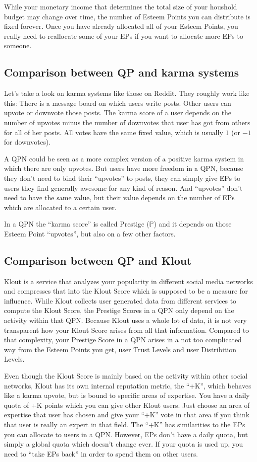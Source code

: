 \documentclass[a4paper,12pt]{scrartcl}
\begin{document}
While your monetary income that determines the total size of your houshold budget may change over time, the number of Esteem Points you can distribute is fixed forever. Once you have already allocated all of your Esteem Points, you really need to reallocate some of your EPs if you want to allocate more EPs to someone.

\subsection{Comparison between QP and karma systems}
Let's take a look on karma systems like those on Reddit. They roughly work like this: There is a message board on which users write posts. Other users can upvote or downvote those posts. The karma score of a user depends on the number of upvotes minus the number of downvotes that user has got from others for all of her posts. All votes have the same fixed value, which is usually $1$ (or $-1$ for downvotes).

A QPN could be seen as a more complex version of a positive karma system in which there are only upvotes. But users have more freedom in a QPN, because they don't need to bind their ``upvotes'' to posts, they can simply give EPs to users they find generally awesome for any kind of reason. And ``upvotes'' don't need to have the same value, but their value depends on the number of EPs which are allocated to a certain user.

In a QPN the ``karma score'' is called Prestige ($\mathbb{P}$) and it depends on those Esteem Point ``upvotes'', but also on a few other factors.

\subsection{Comparison between QP and Klout}
Klout is a service that analyzes your popularity in different social media networks and compresses that into the Klout Score which is supposed to be a measure for influence. While Klout collects user generated data from different services to compute the Klout Score, the Prestige Scores in a QPN only depend on the activity within that QPN. Because Klout uses a whole lot of data, it is not very transparent how your Klout Score arises from all that information. Compared to that complexity, your Prestige Score in a QPN arises in a not too complicated way from the Esteem Points you get, user Trust Levels and user Distribition Levels.

Even though the Klout Score is mainly based on the activity within other social networks, Klout has its own internal reputation metric, the ``+K'', which behaves like a karma upvote, but is bound to specific areas of expertise. You have a daily quota of +K points which you can give other Klout users. Just choose an area of expertise that user has chosen and give your ``+K'' vote in that area if you think that user is really an expert in that field. The ``+K'' has similarities to the EPs you can allocate to users in a QPN. However, EPs don't have a daily quota, but simply a global quota which doesn't change ever. If your quota is used up, you need to ``take EPs back'' in order to spend them on other users.
\end{document}
